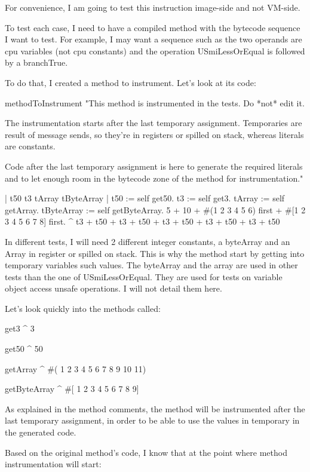 \documentclass[a4paper,12pt,twoside]{../includes/ThesisStyle}
\begin{document}
For convenience, I am going to test this instruction image-side and not VM-side.

To test each case, I need to have a compiled method with the bytecode sequence I want to test. For example, I may want a sequence such as the two operands are cpu variables (not cpu constants) and the operation USmiLessOrEqual is followed by a branchTrue.

To do that, I created a method to instrument. Let's look at its code:

methodToInstrument
"This method is instrumented in the tests. Do *not* edit it.

The instrumentation starts after the last temporary assignment.
Temporaries are result of message sends, so they're in registers
or spilled on stack, whereas literals are constants.

Code after the last temporary assignment is here to generate the
required literals and to let enough room in the bytecode zone of
the method for instrumentation."

\begin{code}
| t50 t3 tArray tByteArray |
t50 := self get50.
t3 := self get3.
tArray := self getArray.
tByteArray := self getByteArray.
5 + 10 + #(1 2 3 4 5 6) first + #[1 2 3 4 5 6 7 8] first.
^ t3 + t50 + t3 + t50 + t3 + t50 + t3 + t50 + t3 + t50
\end{code}

In different tests, I will need 2 different integer constants, a byteArray and an Array in register or spilled on stack. This is why the method start by getting into temporary variables such values. The byteArray and the array are used in other tests than the one of USmiLessOrEqual. They are used for tests on variable object access unsafe operations. I will not detail them here.

Let's look quickly into the methods called:

\begin{code}
get3
^ 3

get50
^ 50

getArray
^ #( 1 2 3 4 5 6 7 8 9 10 11)

getByteArray
^ #[ 1 2 3 4 5 6 7 8 9]
\end{code}

As explained in the method comments, the method will be instrumented after the last temporary assignment, in order to be able to use the values in temporary in the generated code.

Based on the original method's code, I know that at the point where method instrumentation will start:
\end{document}
